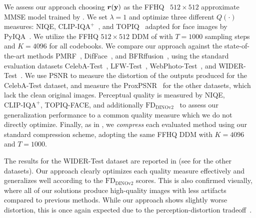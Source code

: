 We assess our approach choosing ${\bm{r}}({\mathbf{y}})$ as the FFHQ~\citep{stylegan} $512\times 512$ approximate MMSE model trained by \citet{difface}.
We set $\lambda=1$ and optimize three different $Q(\cdot)$ measures: NIQE, $\text{CLIP-IQA}^{+}$~\citep{Wang_Chan_Loy_2023}, and TOPIQ~\citep{chen2024topiq} adapted for face images by PyIQA~\citep{pyiqa}.
We utilize the FFHQ $512\times512$ DDM of \citet{difface} with $T=1000$ sampling steps and $K=4096$ for all codebooks.
We compare our approach against the state-of-the-art methods PMRF~\citep{pmrf}, DifFace~\citep{difface}, and BFRffusion~\citep{bfrfussion}, using the standard evaluation datasets CelebA-Test~\citep{karras2018progressive,wang2021gfpgan}, LFW-Test~\citep{lfw-original}, WebPhoto-Test~\citep{wang2021gfpgan}, and WIDER-Test~\citep{zhou2022codeformer}.
We use PSNR to measure the distortion of the outputs produced for the CelebA-Test dataset, and measure the ProxPSNR~\citep{pmrf,man2025proxiesdistortionconsistencyapplications} for the other datasets, which lack the clean original images.
Perceptual quality is measured by NIQE, $\text{CLIP-IQA}^{+}$, TOPIQ-FACE, and additionally $\text{FD}_{\text{DINOv2}}$~\citep{stein2023exposing} to assess our generalization performance to a common quality measure which we do not directly optimize.
Finally, as in , we \emph{compress} each evaluated method using our standard compression scheme, adopting the same FFHQ DDM with $K=4096$ and $T=1000$.

The results for the WIDER-Test dataset are reported in  (see  for the other datasets).
Our approach clearly optimizes each quality measure effectively and generalizes well according to the $\text{FD}_{\text{DINOv2}}$ scores.
This is also confirmed visually, where all of our solutions produce high-quality images with less artifacts compared to previous methods.
While our approach shows slightly worse distortion, this is once again expected due to the perception-distortion tradeoff~\citep{Blau_2018_CVPR}.
